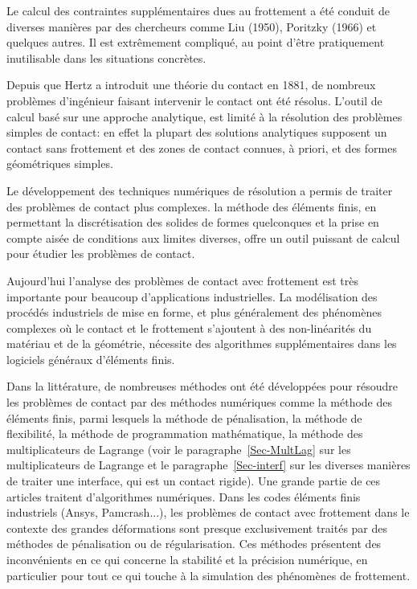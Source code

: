 \begin{histoire}
\medskip
Le calcul des contraintes supplémentaires dues au frottement a été conduit de diverses manières par des chercheurs comme Liu (1950), Poritzky (1966) et quelques autres. Il est extrêmement compliqué, au point d'être pratiquement inutilisable dans les situations concrètes.
\end{histoire}

\medskip
Depuis que Hertz a introduit une théorie du contact en 1881, de nombreux problèmes d'ingénieur faisant intervenir le contact ont été résolus. L'outil de calcul basé sur une approche analytique, est limité à la résolution des problèmes simples de contact: en effet la plupart des solutions analytiques supposent un contact sans frottement et des zones de contact connues, à priori, et des formes géométriques simples.

Le développement des techniques numériques de résolution a permis de traiter des
problèmes de contact plus complexes. la méthode des éléments finis, en permettant la discrétisation des solides de formes quelconques et la prise en compte aisée de conditions aux limites diverses, offre un outil puissant de calcul pour étudier les problèmes de contact.

\medskip
Aujourd'hui l'analyse des problèmes de contact avec frottement est très importante pour beaucoup d'applications industrielles. La modélisation des procédés industriels de mise en forme, et plus généralement des phénomènes complexes où le contact et le frottement s'ajoutent à des non-linéarités du matériau et de la géométrie, nécessite des algorithmes supplémentaires dans les logiciels généraux d'éléments finis.

\medskip
{}

\medskip
Dans la littérature, de nombreuses méthodes ont été développées pour résoudre les problèmes de contact par des méthodes numériques comme la méthode des éléments finis, parmi lesquels la méthode de pénalisation, la méthode de flexibilité, la méthode de programmation mathématique, la méthode des multiplicateurs de Lagrange (voir le paragraphe~\ref{Sec-MultLag} sur les multiplicateurs de Lagrange et le paragraphe~\ref{Sec-interf} sur les diverses manières de traiter une interface, qui est un contact rigide). Une grande partie de ces articles traitent d'algorithmes numériques. Dans les codes éléments finis industriels (Ansys, Pamcrash...), les problèmes de contact avec frottement dans le contexte des grandes déformations sont presque exclusivement traités par des méthodes de pénalisation ou de régularisation. Ces méthodes présentent des inconvénients en ce qui concerne la stabilité et la précision numérique, en particulier pour tout ce qui touche à la simulation des phénomènes de frottement.

